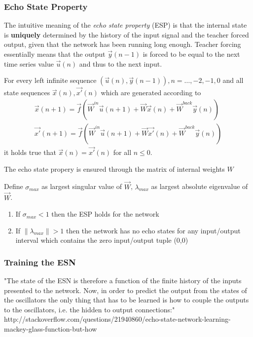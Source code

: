 \subsubsection{Echo State Property}
The intuitive meaning of the \emph{echo state property} (ESP) is that the internal state is \textbf{uniquely} determined by the history of the input signal and the teacher forced output, given that the network has been running long enough. Teacher forcing essentially means that the output $\vec{y}(n-1)$ is forced to be equal to the next time series value $\vec{u}(n)$ and thus to the next input.
\begin{frm-def}
For every left infinite sequence $(\vec{u}(n),\vec{y}(n-1)),n=\dots,-2,-1,0$ and all state sequences $\vec{x}(n),\vec{x'}(n)$ which are generated according to
\begin{align*}	
	\vec{x}(n+1)=\vec{f}(\vec{W}^{in}\vec{u}(n+1)+\vec{W}\vec{x}(n)+\vec{W}^{back}\vec{y}(n))\\
	\vec{x'}(n+1)=\vec{f}(\vec{W}^{in}\vec{u}(n+1)+\vec{W}\vec{x'}(n)+\vec{W}^{back}\vec{y}(n))
\end{align*}
it holds true that $\vec{x}(n)=\vec{x'}(n)$ for all $n \leq 0$.
\end{frm-def}
The echo state propery is ensured through the matrix of internal weights $W$

\begin{frm-thm}
Define $\sigma_{max}$ as largest singular value of $\vec{W}$, $\lambda_{max}$ as largest absolute eigenvalue of $\vec{W}$.
\begin{enumerate}
\item If $\sigma_{max} < 1$ then the ESP holds for the network
\item If $\|\lambda_{max}\| > 1$ then the network has no echo states for any input/output interval which contains the zero input/output tuple (0,0)
\end{enumerate}
\end{frm-thm}

\subsubsection*{Training the ESN}
"The state of the ESN is therefore a function of the finite history of the inputs presented to the network. Now, in order to predict the output from the states of the oscillators the only thing that has to be learned is how to couple the outputs to the oscillators, i.e. the hidden to output connections:"
http://stackoverflow.com/questions/21940860/echo-state-network-learning-mackey-glass-function-but-how

